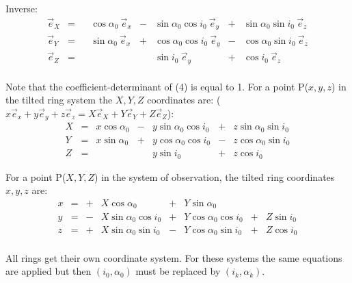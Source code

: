 \documentclass[11pt,a4paper]{article}
\begin{document}
 
Inverse:
\begin{equation}
\begin{array} {rcclclcl}
\vec e_X & = &   & \cos \alpha _0 \: \vec e_x
             & - & \sin \alpha _0 \cos i_0 \: \vec e_y
             & + & \sin \alpha _0 \sin i_0 \: \vec e_z   \nonumber\\
\vec e_Y & = &   & \sin \alpha _0 \: \vec e_x
             & + & \cos \alpha _0 \cos i_0 \: \vec e_y
             & - & \cos \alpha _0 \sin i_0 \: \vec e_z   \\
\vec e_Z & = &   &
             &   & \sin i_0 \: \vec e_y
             & + & \cos i_0 \: \vec e_z   \nonumber \\
\end{array}
\end{equation}

 
Note that the coefficient-determinant of (4) is equal to 1.
For a point P($x,y,z$) in the tilted ring system the $X,Y,Z$
coordinates are:
($ x \vec e_x + y \vec e_y +z \vec e_z
=  X \vec e_X + Y \vec e_Y +Z \vec e_Z $):
\begin{equation}
\begin{array} {rclclcl}
X & = & x \cos \alpha _0 & - & y \sin \alpha _0 \cos i_0
                         & + & z \sin \alpha _0 \sin i_0 \nonumber \\
Y & = & x \sin \alpha _0 & + & y \cos \alpha _0 \cos i_0
                         & - & z \cos \alpha _0 \sin i_0 \\
Z & = &                  &   & y \sin i_0
                         & + & z \cos i_0 \nonumber
\end{array}
\end{equation}
 
For a point P($X,Y,Z$) in the system of observation, the tilted ring 
coordinates $x,y,z$ are:
\begin{equation}
\begin{array} {rclllllll}
x & = &+& X \cos \alpha _0          & + & Y \sin \alpha _0          &   & \nonumber \\
y & = &-& X \sin \alpha _0 \cos i_0 & + & Y \cos \alpha _0 \cos i_0 & + & Z \sin i_0\\
z & = &+& X \sin \alpha _0 \sin i_0 & - & Y \cos \alpha _0 \sin i_0 & + & Z \cos i_0 \nonumber\\
\label{xyzXYZap}
\end{array}
\end{equation}

All rings get their own coordinate system. For these systems
the same equations are applied but then $(i_0, \alpha_0)$ must be replaced
by $(i_k, \alpha _k)$.
\pagebreak
\end{document}
